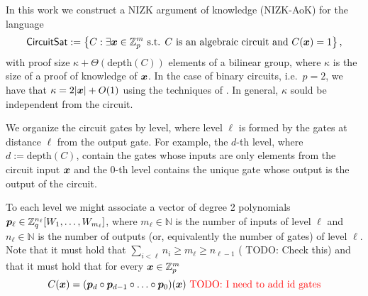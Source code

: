 
\newcommand{\setsize}{t}

In this work we construct a NIZK argument of knowledge (NIZK-AoK) for the language
\[
\mathsf{CircuitSat}:=\left\{
	C : \exists {\boldsymbol{x}}\in\mathbb{Z}_p^m \text{ s.t. } C \text{ is an algebraic circuit and } C({\boldsymbol{x}})=1
	\right\},
\]
with proof size $\kappa+\Theta(\mathrm{depth}(C))$ elements of a bilinear group, where $\kappa$ is the size of a proof of knowledge of ${\boldsymbol{x}}$. In the case of binary circuits, i.e.~$p=2$, we have that $\kappa=2|{\boldsymbol{x}}|+O(1)$ using the techniques of \cite{AC:GonHevRaf15}. In general, $\kappa$ sould be independent from the circuit.
%


We organize the circuit gates by level, where level $\ell$ is formed by the gates at distance $\ell$ from the output gate. For example, the $d$-th level, where $d:=\mathrm{depth}({C})$, contain the gates whose inputs are only elements from the circuit input ${\boldsymbol{x}}$ and the $0$-th level contains the unique gate whose output is the output of the circuit.

To each level we might associate a vector of degree 2 polynomials ${\boldsymbol{p}}_\ell \in \mathbb{Z}_q^{n_\ell}[W_1,\ldots,W_{m_\ell}]$, where $m_\ell\in\mathbb{N}$ is the number of inputs of level $\ell$ and $n_\ell\in\mathbb{N}$ is the number of outputs (or, equivalently the number of gates) of level $\ell$. Note that it must hold that $\sum_{i<\ell} n_i\geq m_\ell \geq n_{\ell-1}$ ({\color{red} TODO: Check this}) and that it must hold that for every ${\boldsymbol{x}}\in\mathbb{Z}_p^m$
$$
C({\boldsymbol{x}}) = ({\boldsymbol{p}}_{d}\circ{\boldsymbol{p}}_{d-1}\circ\ldots\circ {\boldsymbol{p}}_0) ({\boldsymbol{x}}) \text{  \color{red} TODO: I need to add id gates}
$$

